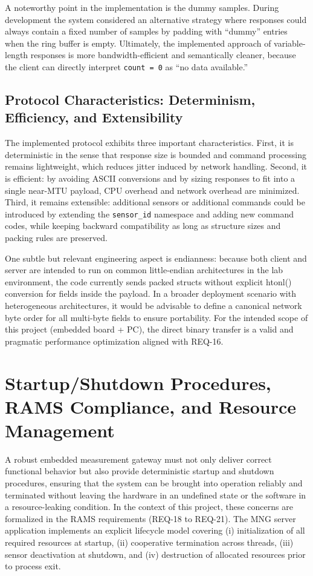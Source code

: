 A noteworthy point in the implementation is the dummy samples. During development the system considered an alternative strategy where responses could always contain a fixed number of samples by padding with “dummy” entries when the ring buffer is empty. Ultimately, the implemented approach of variable-length responses is more bandwidth-efficient and semantically cleaner, because the client can directly interpret \texttt{count = 0} as “no data available.”

\subsection{Protocol Characteristics: Determinism, Efficiency, and Extensibility}

The implemented protocol exhibits three important characteristics. First, it is deterministic in the sense that response size is bounded and command processing remains lightweight, which reduces jitter induced by network handling. Second, it is efficient: by avoiding ASCII conversions and by sizing responses to fit into a single near-MTU payload, CPU overhead and network overhead are minimized. Third, it remains extensible: additional sensors or additional commands could be introduced by extending the \texttt{sensor\_id} namespace and adding new command codes, while keeping backward compatibility as long as structure sizes and packing rules are preserved.

One subtle but relevant engineering aspect is endianness: because both client and server are intended to run on common little-endian architectures in the lab environment, the code currently sends packed structs without explicit htonl() conversion for fields inside the payload. In a broader deployment scenario with heterogeneous architectures, it would be advisable to define a canonical network byte order for all multi-byte fields to ensure portability. For the intended scope of this project (embedded board + PC), the direct binary transfer is a valid and pragmatic performance optimization aligned with REQ-16.

\section{Startup/Shutdown Procedures, RAMS Compliance, and Resource Management}

A robust embedded measurement gateway must not only deliver correct functional behavior but also provide deterministic startup and shutdown procedures, ensuring that the system can be brought into operation reliably and terminated without leaving the hardware in an undefined state or the software in a resource-leaking condition. In the context of this project, these concerns are formalized in the RAMS requirements (REQ-18 to REQ-21). The MNG server application implements an explicit lifecycle model covering (i) initialization of all required resources at startup, (ii) cooperative termination across threads, (iii) sensor deactivation at shutdown, and (iv) destruction of allocated resources prior to process exit.


